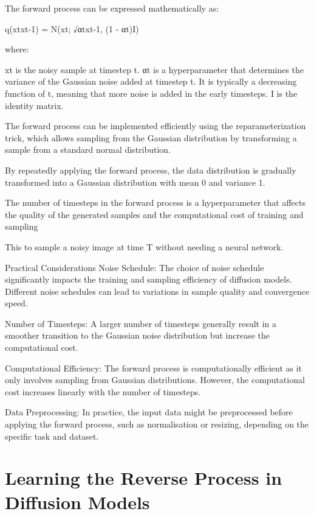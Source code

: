 \documentclass[
]{book}
\begin{document}
The forward process can be expressed mathematically as:

q(xt\textbar xt-1) = N(xt; √αtxt-1, (1 - αt)I)

where:

xt is the noisy sample at timestep t.
αt is a hyperparameter that determines the variance of the Gaussian noise added at timestep t. It is typically a decreasing function of t, meaning that more noise is added in the early timesteps.
I is the identity matrix.

The forward process can be implemented efficiently using the reparameterization trick, which allows sampling from the Gaussian distribution by transforming a sample from a standard normal distribution.

By repeatedly applying the forward process, the data distribution is gradually transformed into a Gaussian distribution with mean 0 and variance 1.

The number of timesteps in the forward process is a hyperparameter that affects the quality of the generated samples and the computational cost of training and sampling

This to sample a noisy image at time T without needing a neural network.

Practical Considerations
Noise Schedule: The choice of noise schedule significantly impacts the training and sampling efficiency of diffusion models. Different noise schedules can lead to variations in sample quality and convergence speed.

Number of Timesteps: A larger number of timesteps generally result in a smoother transition to the Gaussian noise distribution but increase the computational cost.

Computational Efficiency: The forward process is computationally efficient as it only involves sampling from Gaussian distributions. However, the computational cost increases linearly with the number of timesteps.

Data Preprocessing: In practice, the input data might be preprocessed before applying the forward process, such as normalisation or resizing, depending on the specific task and dataset.

\section{Learning the Reverse Process in Diffusion Models}\label{learning-the-reverse-process-in-diffusion-models}
\end{document}
